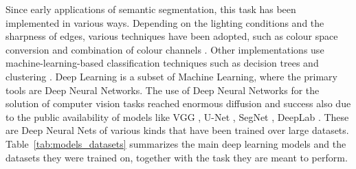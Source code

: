 \documentclass[runningheads]{llncs}
\begin{document}
Since early applications of semantic segmentation, this task has been implemented in various ways. Depending on the lighting conditions and the sharpness of edges, various techniques have been adopted, such as colour space conversion and combination of colour channels \cite{RIEHLE2020105201}. Other implementations use machine-learning-based classification techniques such as decision trees \cite{YANG2015149} and clustering \cite{ZHANG202282}. Deep Learning is a subset of Machine Learning, where the primary tools are Deep Neural Networks. The use of Deep Neural Networks for the solution of computer vision tasks reached enormous diffusion and success also due to the public availability of models like VGG \cite{simonyan2015vgg}, U-Net \cite{ronneberger2015unet}, SegNet \cite{badrinarayanan2016segnet}, DeepLab \cite{chen2017deeplab}. These are Deep Neural Nets of various kinds that have been trained over large datasets. Table~\ref{tab:models_datasets} summarizes the main deep learning models and the datasets they were trained on, together with the task they are meant to perform.
\end{document}
